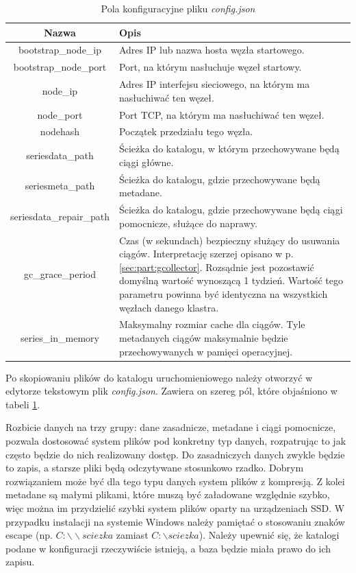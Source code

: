 \documentclass[a4paper,polish,12pt,twoside]{article}
\begin{document}
\begin{table}  \begin{tabular}{|c|p{9cm}|}
\hline Nazwa & Opis \\ \hline
bootstrap\_node\_ip & Adres IP lub nazwa hosta węzła startowego. \\
bootstrap\_node\_port & Port, na którym nasłuchuje węzeł startowy. \\
node\_ip & Adres IP interfejsu sieciowego, na którym ma nasłuchiwać ten węzeł. \\
node\_port & Port TCP, na którym ma nasłuchiwać ten węzeł. \\
nodehash & Początek przedziału tego węzła. \\
seriesdata\_path & Ścieżka do katalogu, w którym przechowywane będą ciągi główne. \\
seriesmeta\_path & Ścieżka do katalogu, gdzie przechowywane będą metadane. \\
seriesdata\_repair\_path & Ścieżka do katalogu, gdzie przechowywane będą ciągi pomocnicze, służące do naprawy. \\
gc\_grace\_period & Czas (w sekundach) bezpieczny służący do usuwania ciągów.  Interpretację szerzej opisano w p. \ref{sec:part:gcollector}. Rozsądnie jest pozostawić domyślną wartość wynoszącą 1 tydzień. Wartość tego parametru powinna być identyczna na wszystkich węzłach danego klastra.\\
series\_in\_memory & Maksymalny rozmiar cache dla ciągów. Tyle metadanych ciągów maksymalnie będzie przechowywanych w pamięci operacyjnej. \\
\hline \end{tabular}
\caption{Pola konfiguracyjne pliku \textit{config.json}} \label{tab:config_fields} \end{table}

Po skopiowaniu plików do katalogu uruchomieniowego należy otworzyć w edytorze tekstowym plik \textit{config.json}. Zawiera on szereg pól, które objaśniono w tabeli \ref{tab:config_fields}.

Rozbicie danych na trzy grupy: dane zasadnicze, metadane i ciągi pomocnicze, pozwala dostosować system plików pod konkretny typ danych, rozpatrując to jak często będzie do nich realizowany dostęp. Do zasadniczych danych zwykle będzie to zapis, a starsze pliki będą odczytywane stosunkowo rzadko. Dobrym rozwiązaniem może być dla tego typu danych system plików z kompresją. Z kolei metadane są małymi plikami, które muszą być załadowane względnie szybko, więc można im przydzielić szybki system plików oparty na urządzeniach SSD. W przypadku instalacji na systemie Windows należy pamiętać o stosowaniu znaków escape (np. $C:{\backslash}{\backslash}sciezka$ zamiast $C:{\backslash}sciezka$). Należy upewnić się, że katalogi podane w konfiguracji rzeczywiście istnieją, a baza będzie miała prawo do ich zapisu.
\end{document}
